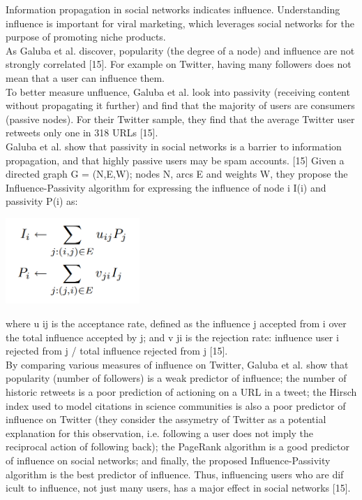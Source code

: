 \documentclass[conference,letterpaper]{IEEEtran}
\begin{document}
Information propagation in social networks indicates influence. Understanding influence is important for viral marketing, which leverages social networks for the purpose of promoting niche products.\\
As Galuba et al. discover, popularity (the degree of a node) and influence are not strongly correlated [15]. For example on Twitter, having many followers does not mean that a user can influence them. \\
To better measure unfluence, Galuba et al. look into passivity (receiving content without propagating it further) and find that the majority of users are consumers (passive nodes). For their Twitter sample, they find that the average Twitter user retweets only one in 318 URLs [15]. \\
Galuba et al. show that passivity in social networks is a barrier to information propagation, and that highly passive users may be spam accounts. [15]
Given a directed graph G = (N,E,W); nodes N, arcs E and weights W, they propose the Influence-Passivity algorithm for expressing the influence of node i I(i) and passivity P(i) as:\\

\centerline{
  \includegraphics[width=2.0in]{influence_passivity.png}
}

where u ij is the acceptance rate, defined as the influence j accepted from i over the total influence accepted by j; and v ji is the rejection rate: influence user i rejected from j / total influence rejected from j [15].\\
By comparing various measures of influence on Twitter, Galuba et al. show that popularity (number of followers) is a weak predictor of influence; the number of historic retweets is a poor prediction of actioning on a URL in a tweet;
the Hirsch index used to model citations in science communities is also a poor predictor of influence on Twitter (they consider the assymetry of Twitter as a potential explanation for this observation, i.e. following a user does not imply the reciprocal action of following back);
the PageRank algorithm is a good predictor of influence on social networks; and finally, the proposed Influence-Passivity algorithm is the best predictor of influence. Thus, influencing users who are dif icult to influence, not just many users, has a major effect in social
networks [15].\\
\end{document}
